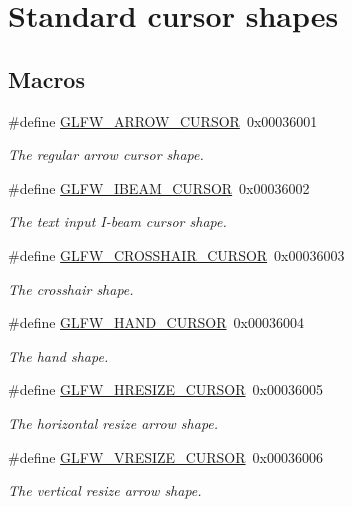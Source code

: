 \hypertarget{group__shapes}{}\section{Standard cursor shapes}
\label{group__shapes}
\subsection*{Macros}
\begin{DoxyCompactItemize}
\item 
\#define \hyperlink{group__shapes_ga8ab0e717245b85506cb0eaefdea39d0a}{G\+L\+F\+W\+\_\+\+A\+R\+R\+O\+W\+\_\+\+C\+U\+R\+S\+OR}~0x00036001
\begin{DoxyCompactList}\small\item\em The regular arrow cursor shape. \end{DoxyCompactList}\item 
\#define \hyperlink{group__shapes_ga36185f4375eaada1b04e431244774c86}{G\+L\+F\+W\+\_\+\+I\+B\+E\+A\+M\+\_\+\+C\+U\+R\+S\+OR}~0x00036002
\begin{DoxyCompactList}\small\item\em The text input I-\/beam cursor shape. \end{DoxyCompactList}\item 
\#define \hyperlink{group__shapes_ga8af88c0ea05ab9e8f9ac1530e8873c22}{G\+L\+F\+W\+\_\+\+C\+R\+O\+S\+S\+H\+A\+I\+R\+\_\+\+C\+U\+R\+S\+OR}~0x00036003
\begin{DoxyCompactList}\small\item\em The crosshair shape. \end{DoxyCompactList}\item 
\#define \hyperlink{group__shapes_ga1db35e20849e0837c82e3dc1fd797263}{G\+L\+F\+W\+\_\+\+H\+A\+N\+D\+\_\+\+C\+U\+R\+S\+OR}~0x00036004
\begin{DoxyCompactList}\small\item\em The hand shape. \end{DoxyCompactList}\item 
\#define \hyperlink{group__shapes_gabb3eb0109f11bb808fc34659177ca962}{G\+L\+F\+W\+\_\+\+H\+R\+E\+S\+I\+Z\+E\+\_\+\+C\+U\+R\+S\+OR}~0x00036005
\begin{DoxyCompactList}\small\item\em The horizontal resize arrow shape. \end{DoxyCompactList}\item 
\#define \hyperlink{group__shapes_gaf024f0e1ff8366fb2b5c260509a1fce5}{G\+L\+F\+W\+\_\+\+V\+R\+E\+S\+I\+Z\+E\+\_\+\+C\+U\+R\+S\+OR}~0x00036006
\begin{DoxyCompactList}\small\item\em The vertical resize arrow shape. \end{DoxyCompactList}\end{DoxyCompactItemize}


